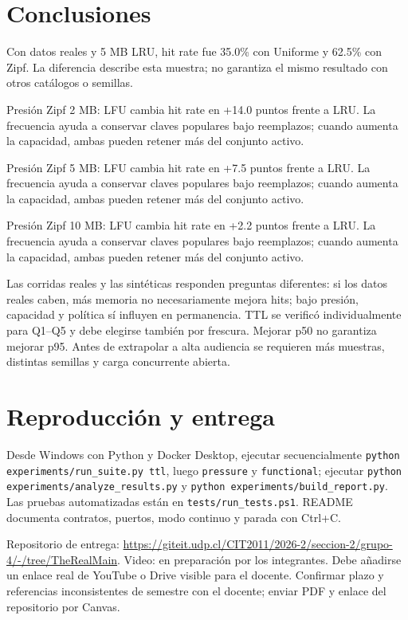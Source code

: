 \documentclass[11pt]{article}
\begin{document}
\section{Conclusiones}
Con datos reales y 5 MB LRU, hit rate fue 35.0\% con Uniforme y 62.5\% con Zipf. La diferencia describe esta muestra; no garantiza el mismo resultado con otros catálogos o semillas.\par
Presión Zipf 2 MB: LFU cambia hit rate en +14.0 puntos frente a LRU. La frecuencia ayuda a conservar claves populares bajo reemplazos; cuando aumenta la capacidad, ambas pueden retener más del conjunto activo.\par
Presión Zipf 5 MB: LFU cambia hit rate en +7.5 puntos frente a LRU. La frecuencia ayuda a conservar claves populares bajo reemplazos; cuando aumenta la capacidad, ambas pueden retener más del conjunto activo.\par
Presión Zipf 10 MB: LFU cambia hit rate en +2.2 puntos frente a LRU. La frecuencia ayuda a conservar claves populares bajo reemplazos; cuando aumenta la capacidad, ambas pueden retener más del conjunto activo.\par
Las corridas reales y las sintéticas responden preguntas diferentes: si los datos reales caben, más memoria no necesariamente mejora hits; bajo presión, capacidad y política sí influyen en permanencia. TTL se verificó individualmente para Q1--Q5 y debe elegirse también por frescura. Mejorar p50 no garantiza mejorar p95. Antes de extrapolar a alta audiencia se requieren más muestras, distintas semillas y carga concurrente abierta.\par

\section{Reproducción y entrega}
Desde Windows con Python y Docker Desktop, ejecutar secuencialmente \texttt{python experiments/run\_suite.py ttl}, luego \texttt{pressure} y \texttt{functional}; ejecutar \texttt{python experiments/analyze\_results.py} y \texttt{python experiments/build\_report.py}. Las pruebas automatizadas están en \texttt{tests/run\_tests.ps1}. README documenta contratos, puertos, modo continuo y parada con Ctrl+C.

Repositorio de entrega: \url{https://giteit.udp.cl/CIT2011/2026-2/seccion-2/grupo-4/-/tree/TheRealMain}. Video: en preparación por los integrantes. Debe añadirse un enlace real de YouTube o Drive visible para el docente. Confirmar plazo y referencias inconsistentes de semestre con el docente; enviar PDF y enlace del repositorio por Canvas.
\end{document}
